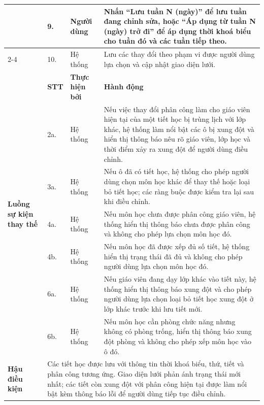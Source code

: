 \documentclass[../DoAn.tex]{subfiles}
\begin{document}
\begin{longtable}{|p{2.8cm}|p{1cm}|p{2.8cm}|p{6.3cm}|}
& 9. & Người dùng & Nhấn ``Lưu tuần N (ngày)'' để lưu tuần đang chỉnh sửa, hoặc ``Áp dụng từ tuần N (ngày) trở đi'' để áp dụng thời khoá biểu cho tuần đó và các tuần tiếp theo. \\
\cline{2-4}
& 10. & Hệ thống & Lưu các thay đổi theo phạm vi được người dùng lựa chọn và cập nhật giao diện lưới. \\
\hline
\multirow{7}{2.8cm}{\textbf{Luồng sự kiện thay thế}} & \textbf{STT} & \textbf{Thực hiện bởi} & \textbf{Hành động} \\
\cline{2-4}
& 2a. & Hệ thống & Nếu việc thay đổi phân công làm cho giáo viên hiện tại của một tiết học bị trùng lịch với lớp khác, hệ thống làm nổi bật các ô bị xung đột và hiển thị thông báo nêu rõ giáo viên, lớp học và thời điểm xảy ra xung đột để người dùng điều chỉnh. \\
\cline{2-4}
& 3a. & Hệ thống & Nếu ô đã có tiết học, hệ thống cho phép người dùng chọn môn học khác để thay thế hoặc loại bỏ tiết học; các ràng buộc được kiểm tra lại sau khi điều chỉnh. \\
\cline{2-4}
& 4a. & Hệ thống & Nếu môn học chưa được phân công giáo viên, hệ thống hiển thị thông báo chưa được phân công và không cho phép lựa chọn môn học đó. \\
\cline{2-4}
& 4b. & Hệ thống & Nếu môn học đã được xếp đủ số tiết, hệ thống hiển thị trạng thái đã đủ và không cho phép người dùng lựa chọn môn học đó. \\
\cline{2-4}
& 6a. & Hệ thống & Nếu giáo viên đang dạy lớp khác vào tiết này, hệ thống hiển thị thông báo xung đột và cho phép người dùng lựa chọn loại bỏ tiết học xung đột ở lớp khác trước khi lưu tiết mới. \\
\cline{2-4}
& 6b. & Hệ thống & Nếu môn học cần phòng chức năng nhưng không có phòng trống, hiển thị thông báo xung đột phòng và không cho phép xếp môn học vào ô đó. \\
\hline
\multicolumn{1}{|l|}{\textbf{Hậu điều kiện}} & \multicolumn{3}{p{10.5cm}|}{Các tiết học được lưu với thông tin thời khoá biểu, thứ, tiết và phân công tương ứng. Giao diện lưới phản ánh trạng thái mới nhất; các tiết còn xung đột với phân công hiện tại được làm nổi bật kèm thông báo lỗi để người dùng tiếp tục điều chỉnh.} \\
\hline
\end{longtable}
\end{document}
